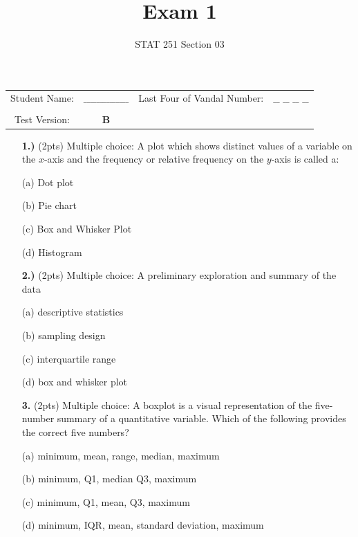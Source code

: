 \documentclass[
]{article}
\title{Exam 1}
\author{STAT 251 Section 03}
\date{}
\begin{document}
\maketitle

\fancyhf{}
\thispagestyle{fancy}

\begin{table}
\centering
\begin{tabular}{cccc}

Student Name: & $\_\_\_\_\_\_\_\_\_\_\_\_\_\_$ & Last Four of Vandal Number:  & $\_\_$ $\_\_$ $\_\_$ $\_\_$ \\
&&& \\
Test Version: & \textbf{B} && \\

\end{tabular}
\end{table}

\newpage

\begin{enumerate}
\item[\bf 1.)]{ (2pts) Multiple choice: A plot which shows distinct values of a variable on the $x$-axis and the frequency or relative frequency on the $y$-axis is called a:}
\item[(a)]{Dot plot}
\item[(b)]{Pie chart}
\item[(c)]{Box and Whisker Plot}
\item[(d)]{Histogram}
\end{enumerate}

\begin{enumerate}
\item[\bf 2.)]{ (2pts) Multiple choice: A preliminary exploration and summary of the data}
\item[(a)]{descriptive statistics}
\item[(b)]{sampling design}
\item[(c)]{interquartile range}
\item[(d)]{box and whisker plot}
\end{enumerate}

\begin{enumerate}
\item[\bf 3.]{(2pts) Multiple choice: A boxplot is a visual representation of the five-number summary of a quantitative variable. Which of the following provides the correct five numbers?}
\item[(a)]{minimum, mean, range, median, maximum}
\item[(b)]{minimum, Q1, median Q3, maximum}
\item[(c)]{minimum, Q1, mean, Q3, maximum}
\item[(d)]{minimum, IQR, mean, standard deviation, maximum}
\end{enumerate}
\end{document}
